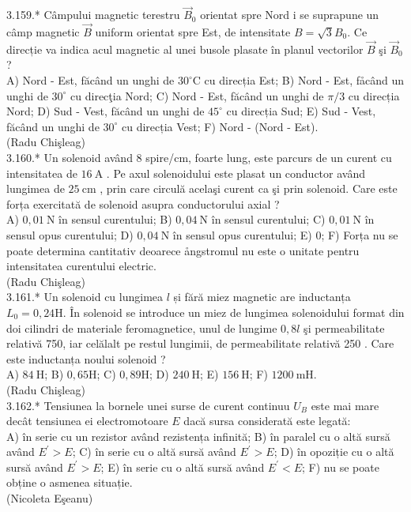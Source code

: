3.159.* Câmpului magnetic terestru $\vec{B}_{0}$ orientat spre Nord i se suprapune un câmp magnetic $\vec{B}$ uniform orientat spre Est, de intensitate $B=\sqrt{3} B_{0}$. Ce direcție va indica acul magnetic al unei busole plasate în planul vectorilor $\vec{B}$ şi $\vec{B}_{0}$ ?\\ A) Nord - Est, făcând un unghi de $30^{\circ} \mathrm{C}$ cu direcția Est; B) Nord - Est, fåcând un unghi de $30^{\circ}$ cu direcţia Nord; C) Nord - Est, făcând un unghi de $\pi / 3$ cu direcția Nord; D) Sud - Vest, făcând un unghi de $45^{\circ}$ cu direcția Sud; E) Sud - Vest, făcând un unghi de $30^{\circ}$ cu direcția Vest; F) Nord - (Nord - Est).\\ (Radu Chişleag)\\

3.160.* Un solenoid având $8$ spire/$\mathrm{cm}$, foarte lung, este parcurs de un curent cu intensitatea de $16 \mathrm{~A}$ . Pe axul solenoidului este plasat un conductor având lungimea de $25 \mathrm{~cm}$ , prin care circulă acelaşi curent ca şi prin solenoid. Care este forța exercitată de solenoid asupra conductorului axial ?\\ A) $0,01 \mathrm{~N}$ în sensul curentului; B) $0,04 \mathrm{~N}$ în sensul curentului; C) $0,01 \mathrm{~N}$ în sensul opus curentului; D) $0,04 \mathrm{~N}$ în sensul opus curentului; E) 0; F) Forța nu se poate determina cantitativ deoarece ångstromul nu este o unitate pentru intensitatea curentului electric.\\ (Radu Chişleag)\\

3.161.* Un solenoid cu lungimea $l$ și fără miez magnetic are inductanța $L_{0}=0,24 \mathrm{H}$. În solenoid se introduce un miez de lungimea solenoidului format din doi cilindri de materiale feromagnetice, unul de lungime $0,8 l$ şi permeabilitate relativă 750, iar celălalt pe restul lungimii, de permeabilitate relativă 250 . Care este inductanța noului solenoid ?\\ A) $84 \mathrm{~H}$; B) $0,65 \mathrm{H}$; C) $0,89 \mathrm{H}$; D) $240 \mathrm{~H}$; E) $156 \mathrm{~H}$; F) $1200 \mathrm{~mH}$.\\ (Radu Chişleag)\\

3.162.* Tensiunea la bornele unei surse de curent continuu $U_{B}$ este mai mare decât tensiunea ei electromotoare $E$ dacă sursa considerată este legată:\\ A) în serie cu un rezistor având rezistența infinită; B) în paralel cu o altă sursă având $E^{\prime}>E$; C) în serie cu o altă sursă având $E^{\prime}>E$; D) în opoziție cu o altă sursă având $E^{\prime}>E$; E) în serie cu o altă sursă având $E^{\prime}<E$; F) nu se poate obține o asmenea situație.\\ (Nicoleta Eşeanu)\\

